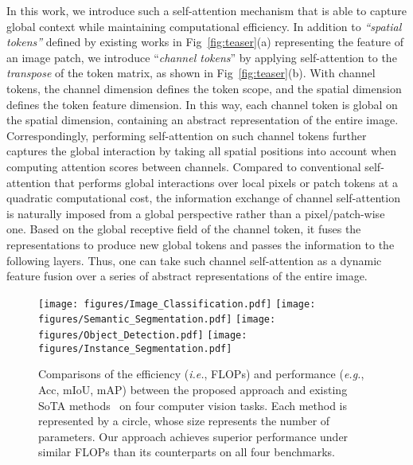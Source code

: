 \documentclass[runningheads]{llncs}
\newcommand{\ie}{\emph{i.e.}}
\newcommand{\eg}{\emph{e.g.}}
\begin{document}
In this work, we introduce such a self-attention mechanism that is able to capture global context while maintaining computational efficiency.
In addition to {\em ``spatial tokens''} defined by existing works in Fig~\ref{fig:teaser}(a) representing the feature of an image patch, we introduce ``{\em channel tokens}'' by applying self-attention to the {\em transpose} of the token matrix, as shown in Fig~\ref{fig:teaser}(b). With channel tokens, the channel dimension defines the token scope, and the spatial dimension defines the token feature dimension.
In this way, each channel token is global on the spatial dimension, containing an abstract representation of the entire image. Correspondingly, performing self-attention on such channel tokens further captures the global interaction by taking all spatial positions into account when computing attention scores between channels.
Compared to conventional self-attention that performs global interactions over local pixels or patch tokens at a quadratic computational cost, the information exchange of channel self-attention is naturally imposed from a global perspective rather than a pixel/patch-wise one.
Based on the global receptive field of the channel token, it fuses the representations to produce new global tokens and passes the information to the following layers.
Thus, one can take such channel self-attention as a dynamic feature fusion over a series of abstract representations of the entire image.


\begin{figure}[t]
  \centering
        \texttt{[image: figures/Image\_Classification.pdf]}
        \texttt{[image: figures/Semantic\_Segmentation.pdf]}
        \texttt{[image: figures/Object\_Detection.pdf]}
        \texttt{[image: figures/Instance\_Segmentation.pdf]}
  \vspace{-8pt}
  \caption{Comparisons of the efficiency (\ie, FLOPs) and performance (\eg, Acc, mIoU, mAP) between the proposed approach and existing SoTA methods~\cite{liu2021swin,yang2021focal,chu2021twins} on four computer vision tasks. Each method is represented by a circle, whose size represents the number of parameters. Our approach achieves superior performance under similar FLOPs than its counterparts on all four benchmarks.
  }
  \label{fig:comparison}
  \vspace{-8pt}
\end{figure}
\end{document}

